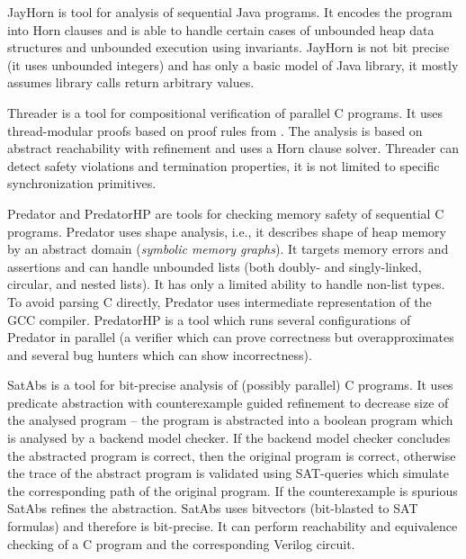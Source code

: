 JayHorn  is tool for analysis of sequential Java programs.
It encodes the program into Horn clauses and is able to handle certain cases of unbounded heap data structures and unbounded execution using invariants.
JayHorn is not bit precise (it uses unbounded integers) and has only a basic model of Java library, it mostly assumes library calls return arbitrary values.

Threader  is a tool for compositional verification of parallel C programs.
It uses thread-modular proofs based on proof rules from .
The analysis is based on abstract reachability with refinement and uses a Horn clause solver.
Threader can detect safety violations and termination properties, it is not limited to specific synchronization primitives.

Predator and PredatorHP  are tools for checking memory safety of sequential C programs.
Predator uses shape analysis, i.e., it describes shape of heap memory by an abstract domain (\emph{symbolic memory graphs}).
It targets memory errors and assertions and can handle unbounded lists (both doubly- and singly-linked, circular, and nested lists).
It has only a limited ability to handle non-list types.
To avoid parsing C directly, Predator uses intermediate representation of the GCC compiler.
PredatorHP is a tool which runs several configurations of Predator in parallel (a verifier which can prove correctness but overapproximates and several bug hunters which can show incorrectness).

SatAbs  is a tool for bit-precise analysis of (possibly parallel) C programs.
It uses predicate abstraction with counterexample guided refinement to decrease size of the analysed program -- the program is abstracted into a boolean program which is analysed by a backend model checker.
If the backend model checker concludes the abstracted program is correct, then the original program is correct, otherwise the trace of the abstract program is validated using SAT-queries which simulate the corresponding path of the original program.
If the counterexample is spurious SatAbs refines the abstraction.
SatAbs uses bitvectors (bit-blasted to SAT formulas) and therefore is bit-precise.
It can perform reachability and equivalence checking of a C program and the corresponding Verilog circuit.

